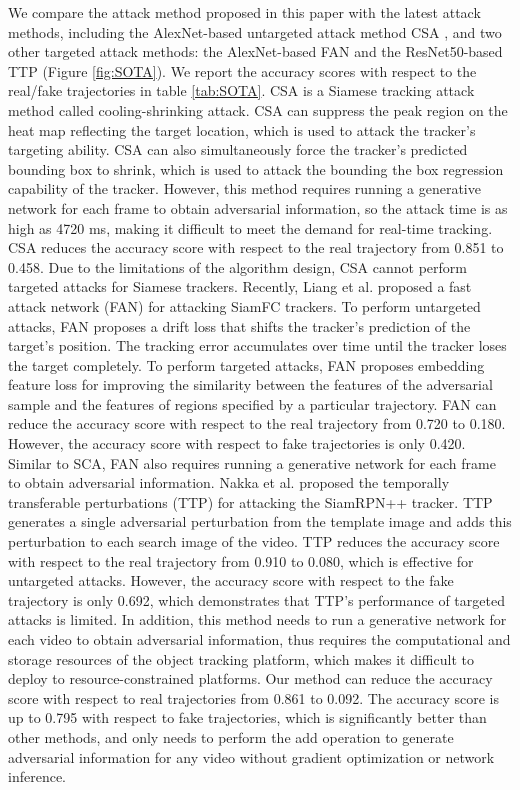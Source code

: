\documentclass[journal]{IEEEtran}
\begin{document}
We compare the attack method proposed in this paper with the latest attack methods, including the AlexNet-based untargeted attack method CSA \cite{CSA}, and two other targeted attack methods: the AlexNet-based FAN \cite{FAN} and the ResNet50-based TTP \cite{TTP} (Figure \ref{fig:SOTA}). We report the accuracy scores with respect to the real/fake trajectories in table \ref{tab:SOTA}. CSA \cite{CSA} is a Siamese tracking attack method called cooling-shrinking attack. CSA can suppress the peak region on the heat map reflecting the target location, which is used to attack the tracker's targeting ability. CSA can also simultaneously force the tracker's predicted bounding box to shrink, which is used to attack the bounding the box regression capability of the tracker. However, this method requires running a generative network for each frame to obtain adversarial information, so the attack time is as high as 4720 ms, making it difficult to meet the demand for real-time tracking. CSA reduces the accuracy score with respect to the real trajectory from 0.851 to 0.458. Due to the limitations of the algorithm design, CSA cannot perform targeted attacks for Siamese trackers. Recently, Liang et al. proposed a fast attack network (FAN) \cite{FAN} for attacking SiamFC trackers. To perform untargeted attacks, FAN proposes a drift loss that shifts the tracker's prediction of the target's position. The tracking error accumulates over time until the tracker loses the target completely. To perform targeted attacks, FAN proposes embedding feature loss for improving the similarity between the features of the adversarial sample and the features of regions specified by a particular trajectory. FAN can reduce the accuracy score with respect to the real trajectory from 0.720 to 0.180. However, the accuracy score with respect to fake trajectories is only 0.420. Similar to SCA, FAN also requires running a generative network for each frame to obtain adversarial information. Nakka et al. \cite{TTP} proposed the temporally transferable perturbations (TTP) for attacking the SiamRPN++ tracker. TTP generates a single adversarial perturbation from the template image and adds this perturbation to each search image of the video. TTP reduces the accuracy score with respect to the real trajectory from 0.910 to 0.080, which is effective for untargeted attacks. However, the accuracy score with respect to the fake trajectory is only 0.692, which demonstrates that TTP's performance of targeted attacks is limited. In addition, this method needs to run a generative network for each video to obtain adversarial information, thus requires the computational and storage resources of the object tracking platform, which makes it difficult to deploy to resource-constrained platforms. Our method can reduce the accuracy score with respect to real trajectories from 0.861 to 0.092. The accuracy score is up to 0.795 with respect to fake trajectories, which is significantly better than other methods, and only needs to perform the add operation to generate adversarial information for any video without gradient optimization or network inference.
\end{document}

